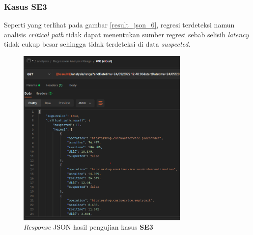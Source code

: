 \subsubsection{Kasus SE3}
Seperti yang terlihat pada gambar \ref{result_json_6}, regresi terdeteksi namun analisis \textit{critical path} tidak dapat menentukan sumber regresi sebab selisih \textit{latency} tidak cukup besar sehingga tidak terdeteksi di data \textit{suspected}.
\begin{figure}[!htb]
	\centering
	\includegraphics[width=0.75\textwidth]{resources/ch4/json/10.png}
	\caption{\textit{Response} JSON hasil pengujian kasus \textbf{SE3}}
	\label{result_json_10}
\end{figure}
\pagebreak

